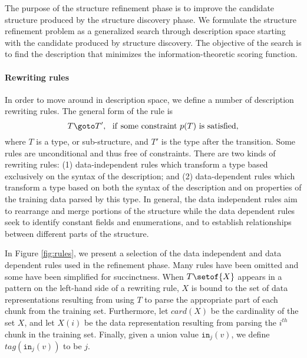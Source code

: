 The purpose of the structure refinement phase is to improve
the candidate structure produced by the structure discovery phase. We
formulate the structure refinement problem as a generalized search
through description space starting with the candidate produced by
structure discovery. The
objective of the search is to find the description that minimizes
the information-theoretic scoring function.

\paragraph*{Rewriting rules}
In order to move around in description space, we define a number of 
description rewriting rules. The general form of the rule is
\[T \goto T', ~~ {\rm if~ some~ constraint~} p(T)~ {\rm is~ satisfied,}\]
where $T$ is a type, or sub-structure, and $T'$ is the type after the
transition.  Some rules are unconditional and thus free of constraints.
There are two kinds of rewriting rules: (1) data-independent rules which
transform a type based exclusively on the syntax of the description; 
and (2) data-dependent
rules which transform a type based on both the syntax of the description
and on properties of the training data
parsed by this type.  In general, 
the data independent rules aim to rearrange and merge portions
of the structure while the data dependent rules seek to identify 
constant fields and enumerations, and to establish relationships 
between different parts of the structure.

In Figure \ref{fig:rules}, we present a selection of the
data independent and data dependent rules used in the refinement phase.
Many rules have been omitted and some have been simplified for succinctness.
When $T\setof{X}$ appears in a pattern on the left-hand side of a rewriting
rule, $X$ is bound to the set of data representations resulting
from using $T$ to parse the appropriate part of each chunk from the training
set. Furthermore, let $card(X)$ be the cardinality of the set $X$, 
and let $X(i)$ be the data representation resulting
from parsing the $i^{th}$ chunk in the training set. Finally, given a union
value $\mathtt{in}_j(v)$, we define $tag(\mathtt{in}_j(v))$ to be $j$.

